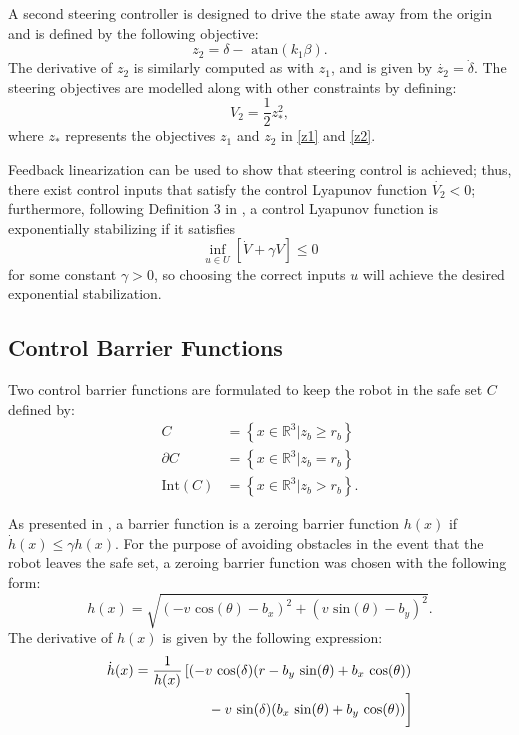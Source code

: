 \documentclass[conference]{IEEEtran}
\begin{document}
A second steering controller is designed to drive the state away from the origin and is defined by the following objective: \begin{equation}z_2=\delta-\text{ atan}(k_1\beta).\label{z2}\end{equation}
The derivative of $z_2$ is similarly computed as with $z_1$, and is given by $\dot{z_2} = \dot{\delta}.$ The steering objectives are modelled along with other constraints by defining: 
\begin{equation} V_2 = \frac{1}{2}  z_*^2, \label{v2}\end{equation}
where $z_*$ represents the objectives $z_1$ and $z_2$ in \eqref{z1} and \eqref{z2}.

Feedback linearization can be used to show that steering control is achieved; thus, there exist control inputs that satisfy the control Lyapunov function $\dot{V_2}<0$; furthermore, following Definition 3 in \cite{ames2014esclf}, a control Lyapunov function is exponentially stabilizing if it satisfies
\begin{equation}
\inf_{u\in U}\left[ \dot{V}+\gamma V \right] \leq 0
\label{eq:esclf}
\end{equation}
for some constant $\gamma >0$, so choosing the correct inputs $u$ will achieve the desired exponential stabilization. 

\subsection{Control Barrier Functions}
Two control barrier functions are formulated to keep the robot in the safe set $C$ defined by:
\begin{align}
C &= \left\lbrace x \in \mathbb{R}^3 | z_b\geq r_b\right\rbrace\\
\partial C &= \left\lbrace x \in \mathbb{R}^3 | z_b=r_b\right\rbrace\\
\text{Int}(C) &= \left\lbrace x \in \mathbb{R}^3 | z_b > r_b\right\rbrace.
\end{align}

As presented in \cite{ames2015robust}, a barrier function is a zeroing barrier function $h(x)$ if $\dot{h}(x)\leq \gamma h(x).$ For the purpose of avoiding obstacles in the event that the robot leaves the safe set, a zeroing barrier function was chosen with the following form:
\begin{equation}
h(x)=\sqrt{(-v\text{ cos}(\theta)-b_x)^2+(v\text{ sin}(\theta)-b_y)^2}.
\end{equation}
The derivative of $h(x)$ is given by the following expression:
\begin{equation}
\begin{split}
\dot{h}(x)=\frac{1}{h(x)} \left[ (-v\text{ cos}(\delta)(r-b_y\text{ sin}(\theta)+b_x\text{ cos}(\theta)) \right. \\
\left. \vphantom{\frac{1}{h(x)}}-v\text{ sin}(\delta)(b_x\text{ sin}(\theta)+b_y\text{ cos}(\theta))\right]
\end{split}
\label{zbf}
\end{equation}
\end{document}
